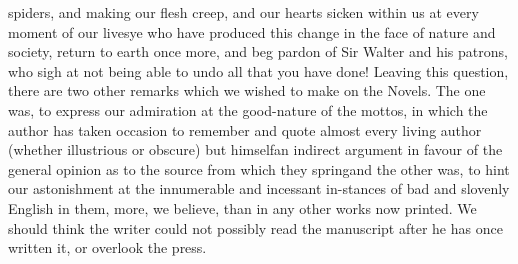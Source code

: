 spiders, and making our flesh creep, and our hearts sicken within
us at every moment of our lives\textemdash ye who have produced this change
in the face of nature and society, return to earth once more, and
beg pardon of Sir Walter and his patrons, who sigh at not being
able to undo all that you have done! Leaving this question, there
are two other remarks which we wished to make on the Novels. The
one was, to express our admiration at the good-nature of the
mottos, in which the author has taken occasion to remember and
quote almost every living author (whether illustrious or obscure)
but himself\textemdash an indirect argument in favour of the general opinion
as to the source from which they spring\textemdash and the other was, to
hint our astonishment at the innumerable and incessant in-stances
of bad and slovenly English in them, more, we believe, than in any
other works now printed. We should think the writer could not
possibly read the manuscript after he has once written it, or
overlook the press.

